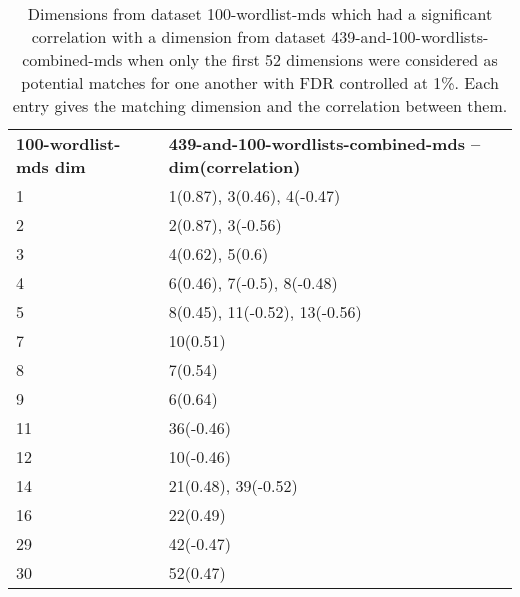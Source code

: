 \begin{table}[!tbp]
    \begin{tabular}{| ll |}
        \hline
        \textbf{100-wordlist-mds dim} & \textbf{439-and-100-wordlists-combined-mds -- dim(correlation)}\\
        1 & 1(0.87), 3(0.46), 4(-0.47)\\
        2 & 2(0.87), 3(-0.56)\\
        3 & 4(0.62), 5(0.6)\\
        4 & 6(0.46), 7(-0.5), 8(-0.48)\\
        5 & 8(0.45), 11(-0.52), 13(-0.56)\\
        7 & 10(0.51)\\
        8 & 7(0.54)\\
        9 & 6(0.64)\\
        11 & 36(-0.46)\\
        12 & 10(-0.46)\\
        14 & 21(0.48), 39(-0.52)\\
        16 & 22(0.49)\\
        29 & 42(-0.47)\\
        30 & 52(0.47)\\
        \hline
    \end{tabular}
    \caption{Dimensions from dataset 100-wordlist-mds which had a significant correlation with a dimension from dataset 439-and-100-wordlists-combined-mds when only the first 52 dimensions were considered as potential matches for one another with FDR controlled at 1\%. Each entry gives the matching dimension and the correlation between them.}
    \label{100-vs-439and100-from-800dim-lowercase-wmt-model-significant-first-52.tex}
\end{table}
